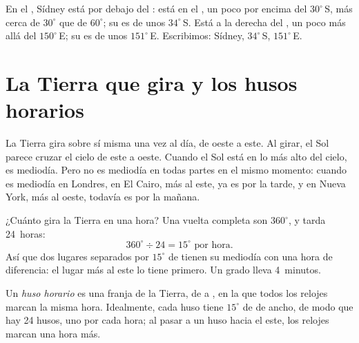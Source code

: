 \begin{example}\label{ex:g6:latitude-longitude:sydney}
En el , Sídney está por debajo del : está en el ,
un poco por encima del  $30^\circ$\,S, más cerca de $30^\circ$
que de $60^\circ$; su  es de unos $34^\circ$\,S. Está a la derecha
del , un poco más allá del  $150^\circ$\,E; su
 es de unos $151^\circ$\,E. Escribimos: Sídney, $34^\circ$\,S,
$151^\circ$\,E.
\end{example}

\section{La Tierra que gira y los husos horarios}

La Tierra gira sobre sí misma una vez al día, de oeste a este. Al girar, el
Sol parece cruzar el cielo de este a oeste. Cuando el Sol está en lo más
alto del cielo, es mediodía. Pero no es mediodía en todas partes en el
mismo momento: cuando es mediodía en Londres, en El Cairo, más al este, ya
es por la tarde, y en Nueva York, más al oeste, todavía es por la mañana.

¿Cuánto gira la Tierra en una hora? Una vuelta completa son $360^\circ$, y
tarda 24~horas:
\[
360^\circ \div 24 = 15^\circ \text{ por hora.}
\]
Así que dos lugares separados por $15^\circ$ de  tienen su mediodía
con una hora de diferencia: el lugar más al este lo tiene primero. Un grado
lleva 4~minutos.

\begin{definition}\label{def:g6:latitude-longitude:time-zone}
Un \emph{huso horario} es una franja de la Tierra, de
 a , en la que todos los relojes marcan la misma hora. Idealmente,
cada huso tiene $15^\circ$ de  de ancho, de modo que hay 24 husos,
uno por cada hora; al pasar a un huso hacia el este, los relojes marcan una
hora más.
\end{definition}

